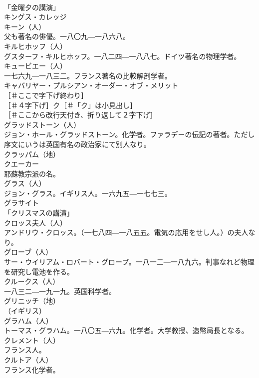 \documentclass[8pt]{extreport}
\begin{document}
\begin{CJK}{UTF8}{min}
\\	「金曜夕の講演」 
\\	キングス・カレッジ 
\\	キーン（人）
\\	父も著名の俳優。一八〇九―一八六八。
\\	キルヒホッフ（人）
\\	グスターフ・キルヒホッフ。一八二四―一八八七。ドイツ著名の物理学者。
\\	キュービエー（人）
\\	一七六九―一八三二。フランス著名の比較解剖学者。
\\	キャバリヤー・プルシアン・オーダー・オブ・メリット 
\\	［＃ここで字下げ終わり］
\\	［＃４字下げ］ク［＃「ク」は小見出し］
\\	［＃ここから改行天付き、折り返して２字下げ］
\\	グラッドストーン（人）
\\	ジョン・ホール・グラッドストーン。化学者。ファラデーの伝記の著者。ただし序文にいうは英国有名の政治家にて別人なり。
\\	クラッパム（地）
\\	クエーカー 
\\	耶蘇教宗派の名。
\\	グラス（人）
\\	ジョン・グラス。イギリス人。一六九五―一七七三。
\\	グラサイト 
\\	「クリスマスの講演」 
\\	クロッス夫人（人）
\\	アンドリウ・クロッス。（一七八四―一八五五。電気の応用をせし人。）の夫人なり。
\\	グローブ（人）
\\	サー・ウイリアム・ロバート・グローブ。一八一二―一八九六。判事なれど物理を研究し電池を作る。
\\	クルークス（人）
\\	一八三二―一九一九。英国科学者。
\\	グリニッチ（地）
\\	（イギリス）
\\	グラハム（人）
\\	トーマス・グラハム。一八〇五―六九。化学者。大学教授、造幣局長となる。
\\	クレメント（人）
\\	フランス人。
\\	クルトア（人）
\\	フランス化学者。

\end{CJK}
\end{document}
